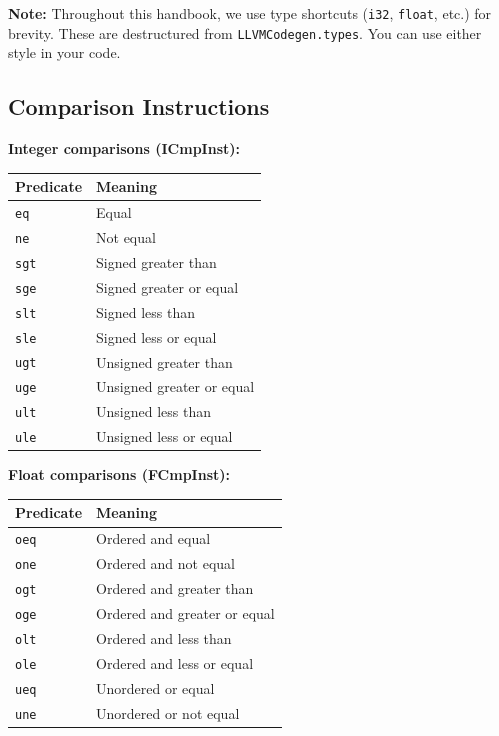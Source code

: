 \documentclass[11pt]{article}
\begin{document}
\textbf{Note:} Throughout this handbook, we use type shortcuts (\texttt{i32}, \texttt{float}, etc.) for brevity. These are destructured from \texttt{LLVMCodegen.types}. You can use either style in your code.

\subsection{Comparison Instructions}

\textbf{Integer comparisons (ICmpInst):}
\begin{center}
\begin{tabular}{|l|l|}
\hline
\textbf{Predicate} & \textbf{Meaning} \\
\hline
\texttt{eq} & Equal \\
\texttt{ne} & Not equal \\
\texttt{sgt} & Signed greater than \\
\texttt{sge} & Signed greater or equal \\
\texttt{slt} & Signed less than \\
\texttt{sle} & Signed less or equal \\
\texttt{ugt} & Unsigned greater than \\
\texttt{uge} & Unsigned greater or equal \\
\texttt{ult} & Unsigned less than \\
\texttt{ule} & Unsigned less or equal \\
\hline
\end{tabular}
\end{center}

\textbf{Float comparisons (FCmpInst):}
\begin{center}
\begin{tabular}{|l|l|}
\hline
\textbf{Predicate} & \textbf{Meaning} \\
\hline
\texttt{oeq} & Ordered and equal \\
\texttt{one} & Ordered and not equal \\
\texttt{ogt} & Ordered and greater than \\
\texttt{oge} & Ordered and greater or equal \\
\texttt{olt} & Ordered and less than \\
\texttt{ole} & Ordered and less or equal \\
\texttt{ueq} & Unordered or equal \\
\texttt{une} & Unordered or not equal \\
\hline
\end{tabular}
\end{center}
\end{document}
